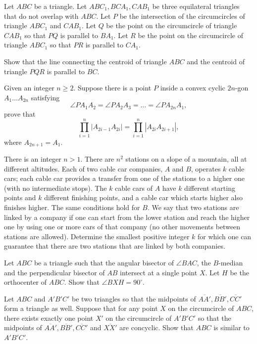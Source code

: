 \documentclass[11pt]{scrartcl}
\begin{document}
\begin{problem}[748616641641895]
Let $ABC$ be a triangle. Let $ABC_1, BCA_1, CAB_1$ be three equilateral triangles that do not overlap with $ABC$.
Let $P$ be the intersection of the circumcircles of triangle $ABC_1$ and $CAB_1$.
Let $Q$ be the point on the circumcircle of triangle $CAB_1$ so that $PQ$ is parallel to $BA_1$. Let $R$ be the point on the circumcircle of triangle $ABC_1$ so that $PR$ is parallel to $CA_1$.

Show that the line connecting the centroid of triangle $ABC$ and the centroid of triangle $PQR$ is parallel to $BC$.
\end{problem}
\begin{problem}[702587891849077]
	Given an integer $n \geqslant 2$. Suppose there is a point $P$ inside a convex cyclic $2n$-gon $A_1 \ldots A_{2n}$ satisfying$$\angle PA_1A_2 = \angle PA_2A_3 = \ldots = \angle PA_{2n}A_1,$$prove that$$ \prod_{i=1}^{n} \left|A_{2i - 1}A_{2i} \right| = \prod_{i=1}^{n} \left|A_{2i}A_{2i+1} \right|,$$where $A_{2n + 1} = A_1$.
\end{problem}
\begin{problem}[695330092247108707]
There is an integer $n > 1$. There are $n^2$ stations on a slope of a mountain, all at different altitudes. Each of two cable car companies, $A$ and $B$, operates $k$ cable cars; each cable car provides a transfer from one of the stations to a higher one (with no intermediate stops). The $k$ cable cars of $A$ have $k$ different starting points and $k$ different finishing points, and a cable car which starts higher also finishes higher. The same conditions hold for $B$. We say that two stations are linked by a company if one can start from the lower station and reach the higher one by using one or more cars of that company (no other movements between stations are allowed). Determine the smallest positive integer $k$ for which one can guarantee that there are two stations that are linked by both companies.
\end{problem}
\begin{problem}[264456837378391]
Let $ABC$ be a triangle such that the angular bisector of $\angle BAC$, the $B$-median and the perpendicular bisector of $AB$ intersect at a single point $X$. Let $H$ be the orthocenter of $ABC$. Show that $\angle BXH = 90^{\circ}$.
\end{problem}
\begin{problem}[915997916422887]
	Let $ABC$ and $A'B'C'$ be two triangles so that the midpoints of $\overline{AA'}, \overline{BB'}, \overline{CC'}$ form a triangle as well. Suppose that for any point $X$ on the circumcircle of $ABC$, there exists exactly one point $X'$ on the circumcircle of $A'B'C'$ so that the midpoints of $\overline{AA'}, \overline{BB'}, \overline{CC'}$ and $\overline{XX'}$ are concyclic. Show that $ABC$ is similar to $A'B'C'$.
\end{problem}
\end{document}

